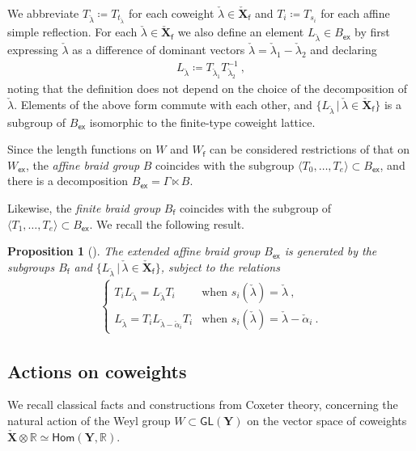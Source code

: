 \documentclass[reqno,a4paper]{amsart}
\newcommand{\R}{\mathbb{R}}
\newcommand{\sff}{\mathsf{f}}
\newcommand{\bfY}{\mathbf{Y}}
\newcommand{\bfX}{\mathbf{X}}
\newcommand{\Lalpha}{\check{\alpha}}
\newcommand{\Llambda}{{\check{\lambda}}}
\newcommand{\rootlattice}{\bfY}
\newcommand{\weightlattice}{\bfX}
\newcommand{\coweightlattice}{\check{\weightlattice}}
\newcommand{\coweightlatticefin}{\coweightlattice_\sff}
\newcommand{\sfex}{\mathsf{ex}}
\newcommand{\Hom}{\mathsf{Hom}}
\newcommand{\GL}{\mathsf{GL}}
\theoremstyle{basic-theorem}
\newtheorem{proposition}[theorem]{Proposition}
\numberwithin{equation}{section}
\begin{document}
We abbreviate $T_{\Llambda}\coloneqq T_{t_{\Llambda}}$ for each coweight $\Llambda\in \coweightlatticefin$ and $T_i\coloneqq T_{s_i}$ for each affine simple reflection. For each $\Llambda\in \coweightlatticefin$ we also define an element $L_{\Llambda}\in B_\sfex$ by first expressing $\Llambda$ as a difference of dominant vectors $\Llambda=\Llambda_1-\Llambda_2$ and declaring
\begin{align}\label{def:Llambda}
    L_{\Llambda} \coloneqq T_{\Llambda_1}T_{\Llambda_2}^{-1}\ ,
\end{align}
noting that the definition does not depend on the choice of the decomposition of $\Llambda$. Elements of the above form commute with each other, and $\{L_\Llambda\,\vert\, \Llambda\in \coweightlatticefin\}$ is a subgroup of $B_\sfex$ isomorphic to the finite-type coweight lattice.

Since the length functions on $W$ and $W_\sff$ can be considered restrictions of that on $W_\sfex$, the \textit{affine braid group} $B$ coincides with the subgroup $\langle T_0,\ldots,T_e\rangle \subset B_\sfex$, and there is a decomposition $B_\sfex = \Gamma \ltimes B$.

Likewise, the \textit{finite braid group} $B_\sff$ coincides with the subgroup of $\langle T_1,\ldots,T_e \rangle \subset B_\sfex$. We recall the following result.
\begin{proposition}[{\cite[\S3.3]{Mc}}]\label{prop:characterization-extended-affine-braid-group}
	The extended affine braid group $B_\sfex$ is generated by the subgroups $B_\sff$ and $\{L_{\Llambda}\,\vert\,\Llambda\in\coweightlatticefin\}$, subject to the relations
	\begin{align}
		\begin{cases}
			T_iL_{\Llambda}=L_{\Llambda} T_i  & \text{when $s_i(\Llambda)=\Llambda$}\ ,\\[4pt]
			L_{\Llambda}=T_iL_{\Llambda-\Lalpha_i} T_i & \text{when $s_i(\Llambda)=\Llambda-\Lalpha_i$}\ .
		\end{cases}
	\end{align}
\end{proposition}

\subsection{Actions on coweights}

We recall classical facts and constructions from Coxeter theory, concerning the natural action of the Weyl group $W\subset \GL(\rootlattice)$ on the vector space of coweights $\coweightlattice\otimes\R \simeq \Hom(\rootlattice,\R)$.
\end{document}
